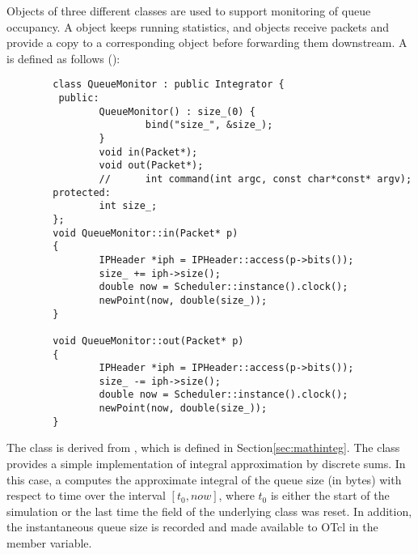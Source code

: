 Objects of three different classes are used to support monitoring
of queue occupancy.
A  object keeps running statistics, and
 objects receive packets and provide
a copy to a corresponding  object before forwarding
them downstream.
A  is defined as follows ():
\begin{small}
\begin{verbatim}
        class QueueMonitor : public Integrator {
         public:
                QueueMonitor() : size_(0) {
                        bind("size_", &size_);
                }
                void in(Packet*);
                void out(Packet*);
                //      int command(int argc, const char*const* argv);
        protected:
                int size_;
        };
        void QueueMonitor::in(Packet* p)
        {
                IPHeader *iph = IPHeader::access(p->bits());
                size_ += iph->size();
                double now = Scheduler::instance().clock();
                newPoint(now, double(size_));
        }

        void QueueMonitor::out(Packet* p)
        {
                IPHeader *iph = IPHeader::access(p->bits());
                size_ -= iph->size();
                double now = Scheduler::instance().clock();
                newPoint(now, double(size_));
        }
\end{verbatim}
\end{small}
The  class is derived from , which
is defined in Section\ref{sec:mathinteg}.
The  class provides a simple implementation of
integral approximation by discrete sums.
In this case, a  computes the approximate integral of the
queue size (in bytes)
with respect to time over the interval $[t_0, now]$, where
$t_0$ is either the start of the simulation or the last time the
 field of the underlying  class was reset.
In addition, the instantaneous queue size is recorded and made available
to OTcl in the  member variable.


